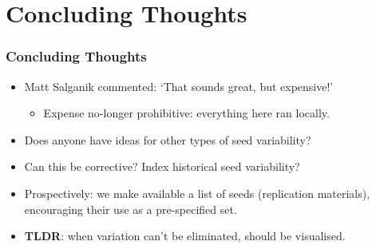 \documentclass[12pt]{beamer}
\begin{document}


\section{Concluding Thoughts}
\begin{frame}
\frametitle{Concluding Thoughts}
\begin{itemize}
\item Matt Salganik commented: `That sounds great, but expensive!'\\ \vspace{.1in}
\begin{itemize}
\item Expense no-longer prohibitive: everything here ran locally.\\ \vspace{.1in}
\end{itemize}
\item Does anyone have ideas for other types of seed variability?\\ \vspace{.1in}

\item Can this be corrective? Index historical seed variability?\\ \vspace{.1in}

\item Prospectively: we make available a list of seeds (replication materials), encouraging their use as a pre-specified set.\\ \vspace{.1in}

\item \textbf{TLDR}: when variation can't be eliminated, should be visualised.


\end{itemize}
\end{frame}
\end{document}
